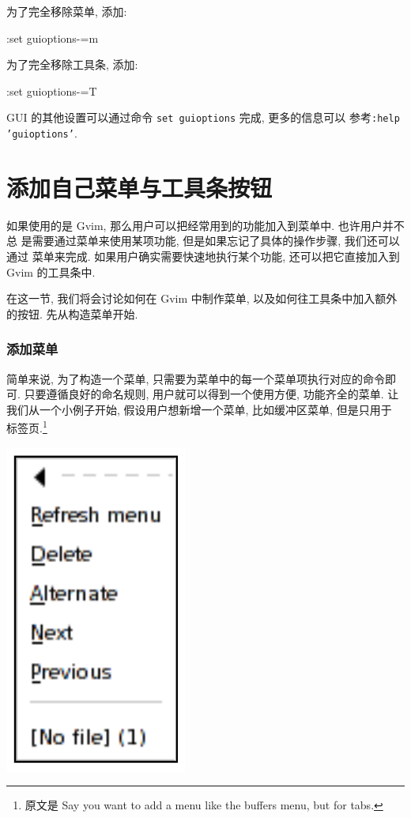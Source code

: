 为了完全移除菜单, 添加:
\begin{vimcmd}
:set guioptions-=m
\end{vimcmd}

为了完全移除工具条, 添加:
\begin{vimcmd}
:set guioptions-=T
\end{vimcmd}

\begin{warning}
    GUI 的其他设置可以通过命令 \texttt{set guioptions} 完成, 更多的信息可以
    参考\texttt{:help 'guioptions'}.
\end{warning}

\section{添加自己菜单与工具条按钮}
\label{sec:adding_your_own_menu_and_toolbar_buttons}
如果使用的是 Gvim, 那么用户可以把经常用到的功能加入到菜单中. 也许用户并不总
是需要通过菜单来使用某项功能, 但是如果忘记了具体的操作步骤, 我们还可以通过
菜单来完成. 如果用户确实需要快速地执行某个功能, 还可以把它直接加入到 Gvim
的工具条中.

在这一节, 我们将会讨论如何在 Gvim 中制作菜单, 以及如何往工具条中加入额外
的按钮. 先从构造菜单开始.

\subsubsection{添加菜单}
\label{subsubsec:adding_a_menu}
简单来说, 为了构造一个菜单, 只需要为菜单中的每一个菜单项执行对应的命令即可.
只要遵循良好的命名规则, 用户就可以得到一个使用方便, 功能齐全的菜单.
让我们从一个小例子开始, 假设用户想新增一个菜单, 比如缓冲区菜单, 但是只用于
标签页.\footnote{ 原文是 Say you want to add a menu like the buffers menu,
but for tabs.}

\begin{center}
\includegraphics[scale=0.42]{./images/page30.png}
\end{center}

